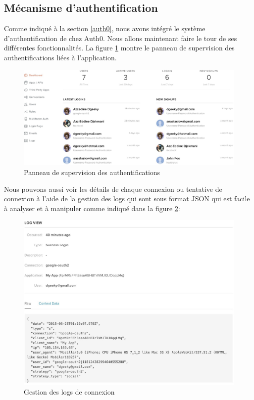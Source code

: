 \subsection{Mécanisme d’authentification}

Comme indiqué à la section \ref{auth0}, nous avons intégré le système d’authentification de chez Auth0. Nous allons maintenant faire le tour de ses différentes fonctionnalités. La figure \ref{e1} montre le panneau de supervision des authentifications liées à l’application.

\vspace{6pt}
\paragraphmark

\begin{figure}[!ht]
\begin{center}
\includegraphics[scale=0.31]{e1.jpg}
\caption{Panneau de supervision des authentifications}
\label{e1}
\end{center}
\end{figure}

\vspace{6pt}
\paragraphmark

Nous pouvons aussi voir les détails de chaque connexion ou tentative de connexion à l’aide de la gestion des logs qui sont sous format JSON qui est facile à analyser et à manipuler comme indiqué dans la figure \ref{e2}:

\newpage

\begin{figure}[!ht]
\begin{center}
\includegraphics[scale=0.38]{e2.jpg}
\caption{Gestion des logs de connexion}
\label{e2}
\end{center}
\end{figure}

